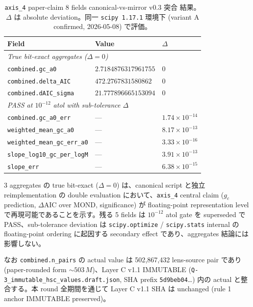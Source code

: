 \documentclass[11pt,a4paper]{ltjsarticle}
\begin{document}
\begin{table}[h]
\centering
\small
\caption{\texttt{axis\_4} paper-claim 8 fields canonical-vs-mirror v0.3 突合
結果。$\Delta$ は absolute deviation。同一 \texttt{scipy 1.17.1} 環境下
(variant A confirmed, 2026-05-08) で評価。}
\label{tab:axis4-paper-claim}
\begin{tabular}{lll}
\hline
Field & Value & $\Delta$ \\
\hline
\multicolumn{3}{l}{\textit{True bit-exact aggregates ($\Delta = 0$)}} \\
\texttt{combined.gc\_a0}                  & $2.7184876317961755$  & $0$ \\
\texttt{combined.delta\_AIC}              & $472.2767831580862$   & $0$ \\
\texttt{combined.dAIC\_sigma}             & $21.777896665153094$  & $0$ \\
\hline
\multicolumn{3}{l}{\textit{PASS at $10^{-12}$ atol with sub-tolerance $\Delta$}} \\
\texttt{combined.gc\_a0\_err}             & ---                   & $1.74 \times 10^{-14}$ \\
\texttt{weighted\_mean\_gc\_a0}           & ---                   & $8.17 \times 10^{-13}$ \\
\texttt{weighted\_mean\_gc\_err\_a0}      & ---                   & $3.33 \times 10^{-16}$ \\
\texttt{slope\_log10\_gc\_per\_logM}      & ---                   & $3.91 \times 10^{-13}$ \\
\texttt{slope\_err}                       & ---                   & $6.38 \times 10^{-15}$ \\
\hline
\end{tabular}
\end{table}

3 aggregates の true bit-exact ($\Delta = 0$) は、canonical script と独立
reimplementation の double evaluation において、\texttt{axis\_4} central
claim ($g_c$ prediction, $\Delta\mathrm{AIC}$ over MOND, significance) が
floating-point representation level で再現可能であることを示す。残る 5 fields
は $10^{-12}$ atol gate を superseded で PASS、sub-tolerance deviation は
\texttt{scipy.optimize} / \texttt{scipy.stats} internal の floating-point
ordering に起因する secondary effect であり、aggregates 結論には影響しない。

なお \texttt{combined.n\_pairs} の actual value は 502{,}867{,}432 lens-source
pair であり (paper-rounded form $\sim 503\,M$)、Layer C v1.1 IMMUTABLE
(\texttt{Q-3\_immutable\_hsc\_values.draft.json}, SHA prefix \texttt{5d9beb04}\dots)
内の actual と整合する。本 round 全期間を通じて Layer C v1.1 SHA は
unchanged (rule 1 anchor IMMUTABLE preserved)。
\end{document}
